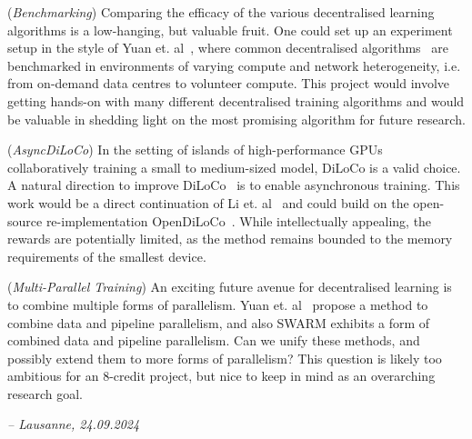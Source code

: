 \documentclass[conference, 10pt]{IEEEtran}
\begin{document}
(\textit{Benchmarking}) Comparing the efficacy of the various decentralised
learning algorithms is a low-hanging, but valuable fruit. One could set up an
experiment setup in the style of Yuan et. al~\cite{yuan2022}, where common
decentralised algorithms~\cite{douillard2023, ryabinin2023, li2024} are
benchmarked in environments of varying compute and network heterogeneity, i.e.
from on-demand data centres to volunteer compute. This project would involve
getting hands-on with many different decentralised training algorithms and would
be valuable in shedding light on the most promising algorithm for future
research.

(\textit{AsyncDiLoCo}) In the setting of islands of high-performance GPUs
collaboratively training a small to medium-sized model, DiLoCo
\cite{douillard2023} is a valid choice. A natural direction to improve
DiLoCo~\cite{douillard2023} is to enable asynchronous training. This work would
be a direct continuation of Li et. al~\cite{li2024} and could build on the
open-source re-implementation OpenDiLoCo~\cite{jaghouar2024}. While
intellectually appealing, the rewards are potentially limited, as the method
remains bounded to the memory requirements of the smallest device.

(\textit{Multi-Parallel Training}) An exciting future avenue for decentralised
learning is to combine multiple forms of parallelism. Yuan et.
al~\cite{yuan2022} propose a method to combine data and pipeline parallelism,
and also SWARM exhibits a form of combined data and pipeline parallelism. Can we
unify these methods, and possibly extend them to more forms of parallelism? This
question is likely too ambitious for an 8-credit project, but nice to keep in
mind as an overarching research goal.

\textit{-- Lausanne, 24.09.2024}



\end{document}
